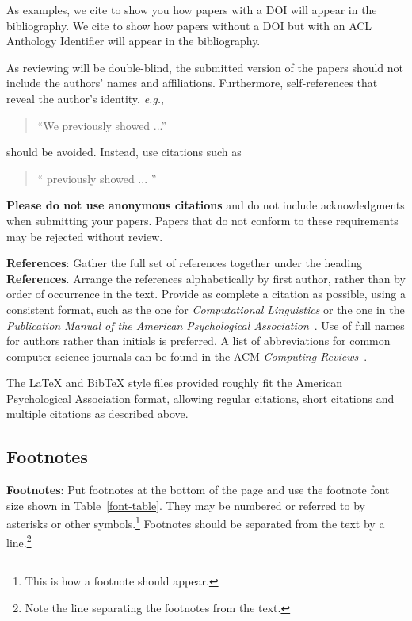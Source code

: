 \documentclass[11pt,a4paper]{article}
\begin{document}
As examples, we cite \cite{P16-1001} to show you how papers with a DOI
will appear in the bibliography.  We cite \cite{C14-1001} to show how
papers without a DOI but with an ACL Anthology Identifier will appear
in the bibliography.  

As reviewing will be double-blind, the submitted version of the papers
should not include the authors' names and affiliations. Furthermore,
self-references that reveal the author's identity, {\em e.g.},
\begin{quote}
``We previously showed \cite{Gusfield:97} ...''  
\end{quote}
should be avoided. Instead, use citations such as 
\begin{quote}
``\citeauthor{Gusfield:97} 
previously showed ... ''
\end{quote}

\textbf{Please do not use anonymous citations} and do not include
acknowledgments when submitting your papers. Papers that do not
conform to these requirements may be rejected without review.

\textbf{References}: Gather the full set of references together under
the heading \textbf{References}. 
Arrange the references alphabetically
by first author, rather than by order of occurrence in the text.
Provide as complete a citation as possible, using a consistent format,
such as the one for {\em Computational Linguistics\/} or the one in the 
{\em Publication Manual of the American 
Psychological Association\/}~\cite{APA:83}.  Use of full names for
authors rather than initials is preferred.
A list of abbreviations for common computer science journals can be found in the ACM {\em Computing Reviews\/}~\cite{ACM:83}.

The \LaTeX{} and Bib\TeX{} style files provided roughly fit the
American Psychological Association format, allowing regular citations, 
short citations and multiple citations as described above.

\subsection{Footnotes}

\textbf{Footnotes}: Put footnotes at the bottom of the page and use the footnote font size shown in Table~\ref{font-table}. They may be numbered or referred to by asterisks or other
symbols.\footnote{This is how a footnote should appear.} Footnotes
should be separated from the text by a line.\footnote{Note the line
separating the footnotes from the text.}
\end{document}
